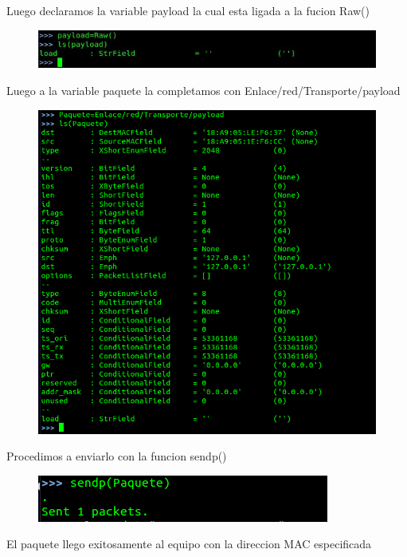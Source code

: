 \documentclass{udpreport}
\begin{document}
Luego declaramos la variable payload la cual esta ligada a la fucion Raw()
\begin{figure}[H]
    \centering
    \includegraphics[scale=0.7]{images/ppaso5.png}
    \label{fig:my_label}
\end{figure}
\vspace{14cm}
Luego a la variable paquete la completamos con Enlace/red/Transporte/payload
\begin{figure}[H]
    \centering
    \includegraphics[scale=0.7]{images/ppaso6.png}
    \label{fig:my_label}
\end{figure}
Procedimos a enviarlo con la funcion sendp()
\begin{figure}[H]
    \centering
    \includegraphics[scale=0.7]{images/ppaso7.png}
    \label{fig:my_label}
\end{figure}
\vspace{14cm}
El paquete llego exitosamente al equipo con la direccion MAC especificada
\end{document}
